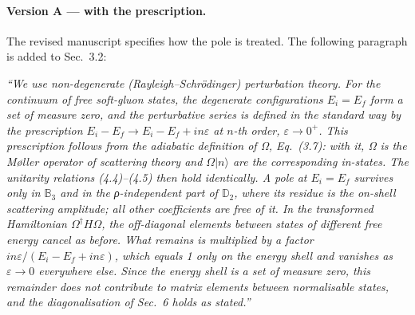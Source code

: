 \documentclass[11pt,a4paper]{article}
\begin{document}
\paragraph{Version A --- with the prescription.}

The revised manuscript specifies how the pole is treated. The following paragraph is added to Sec.~3.2:
\begin{changes}
\textit{``We use non-degenerate (Rayleigh--Schr\"odinger) perturbation theory. For the continuum of free soft-gluon states, the degenerate configurations $E_i=E_f$ form a set of measure zero, and the perturbative series is defined in the standard way by the prescription $E_i-E_f\to E_i-E_f+in\varepsilon$ at $n$-th order, $\varepsilon\to0^+$. This prescription follows from the adiabatic definition of Ω, Eq.~(3.7): with it, Ω is the M\o ller operator of scattering theory and $\Omega|n\rangle$ are the corresponding in-states. The unitarity relations (4.4)--(4.5) then hold identically. A pole at $E_i=E_f$ survives only in $\mathbb B_3$ and in the ρ-independent part of $\mathbb D_2$, where its residue is the on-shell scattering amplitude; all other coefficients are free of it. In the transformed Hamiltonian $\Omega^\dagger H\Omega$, the off-diagonal elements between states of different free energy cancel as before. What remains is multiplied by a factor $in\varepsilon/(E_i-E_f+in\varepsilon)$, which equals 1 only on the energy shell and vanishes as $\varepsilon\to0$ everywhere else. Since the energy shell is a set of measure zero, this remainder does not contribute to matrix elements between normalisable states, and the diagonalisation of Sec.~6 holds as stated.''}
\end{changes}
\end{document}
